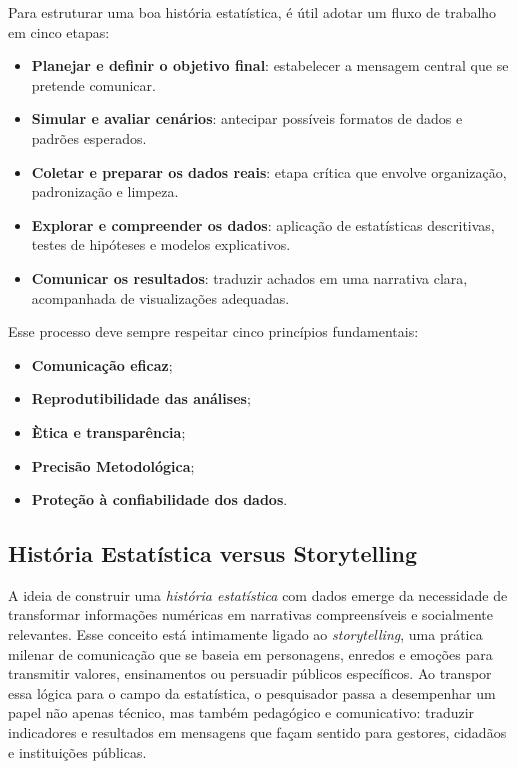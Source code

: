 Para estruturar uma boa história estatística, é útil adotar um fluxo de trabalho em cinco etapas:

\begin{itemize}
\item[{a)}] \textbf{Planejar e definir o objetivo final}: estabelecer a mensagem central que se pretende comunicar.
\item[{b)}] \textbf{Simular e avaliar cenários}: antecipar possíveis formatos de dados e padrões esperados.
\item[{c)}] \textbf{Coletar e preparar os dados reais}: etapa crítica que envolve organização, padronização e limpeza.
\item[{d)}] \textbf{Explorar e compreender os dados}: aplicação de estatísticas descritivas, testes de hipóteses e modelos explicativos.
\item[{e)}] \textbf{Comunicar os resultados}: traduzir achados em uma narrativa clara, acompanhada de visualizações adequadas.
\end{itemize}

Esse processo deve sempre respeitar cinco princípios fundamentais:

\begin{itemize}
\item \textbf{Comunicação eficaz};
\item \textbf{Reprodutibilidade das análises};
\item \textbf{Ètica e transparência};
\item \textbf{Precisão Metodológica};
\item \textbf{Proteção à confiabilidade dos dados}.
\end{itemize}


\newpage
\subsection{História Estatística versus Storytelling}

A ideia de construir uma \textit{história estatística} com dados emerge da necessidade de transformar informações numéricas em narrativas compreensíveis e socialmente relevantes. Esse conceito está intimamente ligado ao \textit{storytelling}, uma prática milenar de comunicação que se baseia em personagens, enredos e emoções para transmitir valores, ensinamentos ou persuadir públicos específicos. Ao transpor essa lógica para o campo da estatística, o pesquisador passa a desempenhar um papel não apenas técnico, mas também pedagógico e comunicativo: traduzir indicadores e resultados em mensagens que façam sentido para gestores, cidadãos e instituições públicas.\vskip0.3cm

